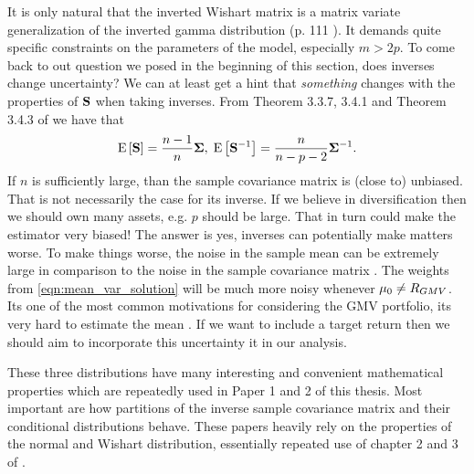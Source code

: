 \documentclass[oneside]{book}\usepackage{knitr}
\begin{document}
It is only natural that the inverted Wishart matrix is a matrix variate generalization of the inverted gamma distribution (p. 111 \citet{GuptaNagar2000}). 
It demands quite specific constraints on the parameters of the model, especially $m > 2p$.
To come back to out question we posed in the beginning of this section, does inverses change uncertainty? 
We can at least get a hint that \textit{something} changes with the properties of $\mathbf{S}$ when taking inverses.
From Theorem 3.3.7, 3.4.1 and Theorem 3.4.3 of \citet{GuptaNagar2000} we have that
$$
\operatorname{E}\left[\mathbf{S}\right] = \frac{n-1}{n} \mathbf{\Sigma}, \; 
\operatorname{E}\left[\mathbf{S}^{-1}\right] = \frac{n}{n-p-2}\mathbf{\Sigma}^{-1}.
$$
If $n$ is sufficiently large, than the sample covariance matrix is (close to) unbiased.
That is not necessarily the case for its inverse.
If we believe in diversification then we should own many assets, e.g. $p$ should be large. 
That in turn could make the estimator very biased!
The answer is yes, inverses can potentially make matters worse.
To make things worse, the noise in the sample mean can be extremely large in comparison to the noise in the sample covariance matrix \cite{REF}.
The weights from \eqref{eqn:mean_var_solution} will be much more noisy whenever $\mu_0 \neq R_{GMV}$. 
Its one of the most common motivations for considering the GMV portfolio, its very hard to estimate the mean \citep{golosnoy2019exponential}.  
If we want to include a target return then we should aim to incorporate this uncertainty it in our analysis.

These three distributions have many interesting and convenient mathematical properties which are repeatedly used in Paper 1 and 2 of this thesis.
Most important are how partitions of the inverse sample covariance matrix and their conditional distributions behave.
These papers heavily rely on the properties of the normal and Wishart distribution, essentially repeated use of chapter 2 and 3 of \citet{GuptaNagar2000}.
\end{document}
